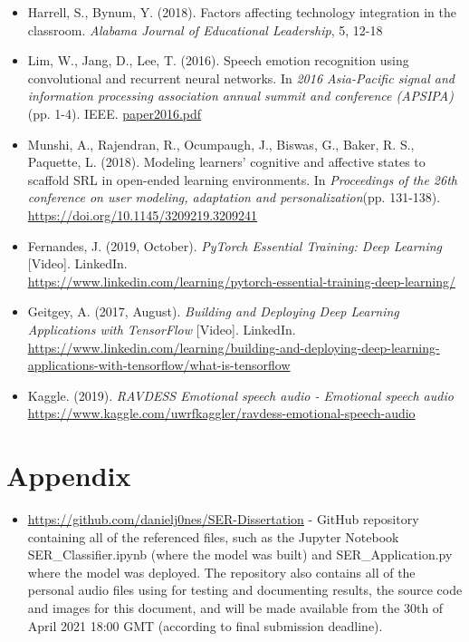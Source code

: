 \documentclass[12pt]{article}
\begin{document}
\begin{itemize}
\item Harrell, S., Bynum, Y. (2018). Factors affecting technology integration in the classroom. \textit{Alabama Journal of Educational Leadership}, 5, 12-18

\item Lim, W., Jang, D., Lee, T. (2016). Speech emotion recognition using convolutional and recurrent neural networks. In \textit{2016 Asia-Pacific signal and information processing association annual summit and conference (APSIPA)} (pp. 1-4). IEEE. \href{http://www.apsipa.org/proceedings_2016/HTML/paper2016/137.pdf}{paper2016.pdf}

\item Munshi, A., Rajendran, R., Ocumpaugh, J., Biswas, G., Baker, R. S., Paquette, L. (2018). Modeling learners' cognitive and affective states to scaffold SRL in open-ended learning environments. In \textit{Proceedings of the 26th conference on user modeling, adaptation and personalization}(pp. 131-138). \tab \href{https://doi.org/10.1145/3209219.3209241}{https://doi.org/10.1145/3209219.3209241}

\item Fernandes, J. (2019, October). \textit{PyTorch Essential Training: Deep Learning} [Video]. LinkedIn. \\ \href{https://www.linkedin.com/learning/pytorch-essential-training-deep-learning/welcome?u=2039756}{https://www.linkedin.com/learning/pytorch-essential-training-deep-learning/}

\item Geitgey, A. (2017, August). \textit{Building and Deploying Deep Learning Applications with TensorFlow} [Video]. LinkedIn. \href{https://www.linkedin.com/learning/building-and-deploying-deep-learning-applications-with-tensorflow/what-is-tensorflow?u=2039756}{https://www.linkedin.com/learning/building-and-deploying-deep-learning-applications-with-tensorflow/what-is-tensorflow}

\item Kaggle. (2019). \textit{RAVDESS Emotional speech audio - Emotional speech audio}\\\href{https://www.kaggle.com/uwrfkaggler/ravdess-emotional-speech-audio}{https://www.kaggle.com/uwrfkaggler/ravdess-emotional-speech-audio}
\end{itemize}
\section{Appendix}
\begin{itemize}

\item \href{https://github.com/danielj0nes/SER-Dissertation}{https://github.com/danielj0nes/SER-Dissertation} - GitHub repository containing all of the referenced files, such as the Jupyter Notebook SER\_Classifier.ipynb (where the model was built) and SER\_Application.py where the model was deployed. The repository also contains all of the personal audio files using for testing and documenting results, the source code and images for this document, and will be made available from the 30th of April 2021 18:00 GMT (according to final submission deadline).

\end{itemize}
\end{document}
